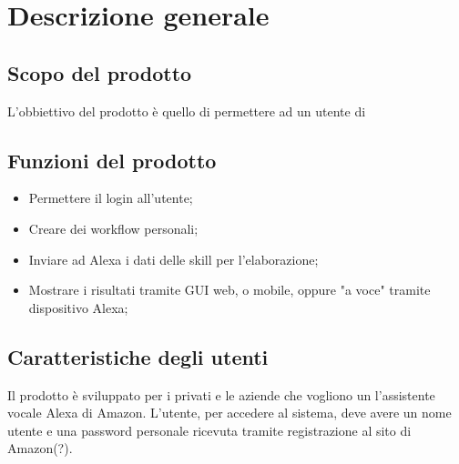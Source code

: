 \chapter{Descrizione generale}

\section{Scopo del prodotto}
L'obbiettivo del prodotto è quello di permettere ad un utente di 
\section{Funzioni del prodotto}
\begin{itemize}
	\item Permettere il login all'utente;
	\item Creare dei workflow personali;
	\item Inviare ad Alexa i dati delle skill per l'elaborazione;
	\item Mostrare i risultati tramite GUI web, o mobile, oppure "a voce" tramite dispositivo Alexa;
\end{itemize}

\section{Caratteristiche degli utenti}
Il prodotto è sviluppato per i privati e le aziende che vogliono un l'assistente vocale Alexa di Amazon.
L'utente, per accedere al sistema, deve avere un nome utente e una password personale ricevuta tramite registrazione al sito di Amazon(?).